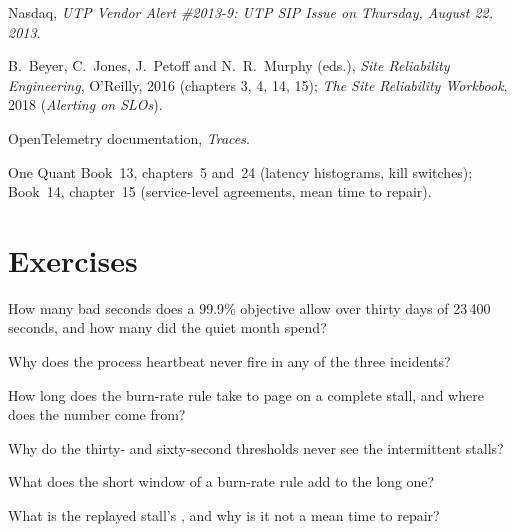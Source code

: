 \begin{omsources}
\item Nasdaq, \emph{UTP Vendor Alert \#2013-9: UTP SIP Issue on Thursday, August 22, 2013}.
\item B.~Beyer, C.~Jones, J.~Petoff and N.~R.~Murphy (eds.), \emph{Site Reliability Engineering}, O'Reilly, 2016 (chapters 3, 4, 14, 15);
\emph{The Site Reliability Workbook}, 2018 (\emph{Alerting on SLOs}).
\item OpenTelemetry documentation, \emph{Traces}.
\item One Quant Book~13, chapters~5 and~24 (latency histograms, kill switches); Book~14, chapter~15 (service-level agreements, mean time to
repair).
\end{omsources}

\section{Exercises}

\begin{exercise}[$\star$]\label{exo:pl:observability-and-incident-response:1}
How many bad seconds does a 99.9\% objective allow over thirty days of 23\,400 seconds, and how many did the quiet month spend?
\end{exercise}

\begin{exercise}[$\star$]\label{exo:pl:observability-and-incident-response:2}
Why does the process heartbeat never fire in any of the three incidents?
\end{exercise}

\begin{exercise}[$\star$]\label{exo:pl:observability-and-incident-response:3}
How long does the burn-rate rule take to page on a complete stall, and where does the number come from?
\end{exercise}

\begin{exercise}[$\star\star$]\label{exo:pl:observability-and-incident-response:4}
Why do the thirty- and sixty-second thresholds never see the intermittent stalls?
\end{exercise}

\begin{exercise}[$\star\star$]\label{exo:pl:observability-and-incident-response:5}
What does the short window of a burn-rate rule add to the long one?
\end{exercise}

\begin{exercise}[$\star\star$]\label{exo:pl:observability-and-incident-response:6}
What is the replayed stall's , and why is it not a mean time to repair?
\end{exercise}


